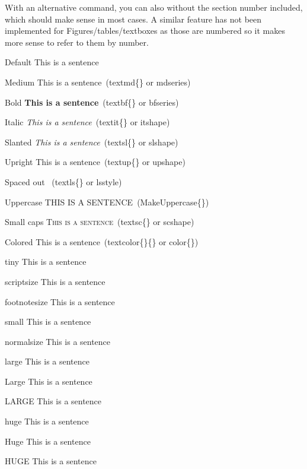 With an alternative command, you can also  without the section number included, which should make sense in most cases. A similar feature has not been implemented for Figures/tables/textboxes as those are numbered so it makes more sense to refer to them by number.


\newcommand\demoString{This is a sentence}

\begin{wrtxListMeta}
  \item[Default] \demoString
  \item[Medium] \textmd{\demoString}\ (textmd\{\} or mdseries)
  \item[Bold] \textbf{\demoString}\ (textbf\{\} or bfseries)
  \item[Italic] \textit{\demoString}\ (textit\{\} or itshape)
  \item[Slanted] \textsl{\demoString}\ (textsl\{\} or slshape)
  \item[Upright] \textup{\demoString}\ (textup\{\} or upshape)
  \item[Spaced out] \textls{\demoString} \ (textls\{\} or lsstyle) %
  \item[Uppercase] \MakeUppercase{\demoString}\ (MakeUppercase\{\})
  \item[Small caps] \textsc{\demoString}\ (textsc\{\} or scshape)
  \item[Colored] \textcolor{wrtxColorSuccess}{\demoString}\ (textcolor\{\}\{\} or color\{\})
\end{wrtxListMeta}

\begin{wrtxListMeta}
  \item[tiny] {\tiny\demoString}
  \item[scriptsize] {\scriptsize\demoString}
  \item[footnotesize] {\footnotesize\demoString}
  \item[small] {\small\demoString}
  \item[normalsize] {\normalsize\demoString}
  \item[large] {\large\demoString}
  \item[Large] {\Large\demoString}
  \item[LARGE] {\LARGE\demoString}
  \item[huge] {\huge\demoString}
  \item[Huge] {\Huge\demoString}
  \item[HUGE] {\HUGE\demoString}
\end{wrtxListMeta}


